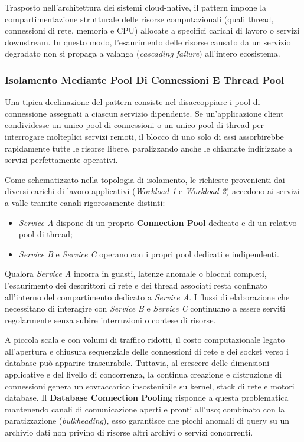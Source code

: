 \documentclass[11pt, a4paper]{article}
\begin{document}
Trasposto nell'architettura dei sistemi cloud-native, il pattern impone la compartimentazione strutturale delle risorse computazionali (quali thread, connessioni di rete, memoria e CPU) allocate a specifici carichi di lavoro o servizi downstream. In questo modo, l'esaurimento delle risorse causato da un servizio degradato non si propaga a valanga (\emph{cascading failure}) all'intero ecosistema.

\subsubsection{Isolamento Mediante Pool Di Connessioni E Thread Pool}

Una tipica declinazione del pattern consiste nel disaccoppiare i pool di connessione assegnati a ciascun servizio dipendente. Se un'applicazione client condividesse un unico pool di connessioni o un unico pool di thread per interrogare molteplici servizi remoti, il blocco di uno solo di essi assorbirebbe rapidamente tutte le risorse libere, paralizzando anche le chiamate indirizzate a servizi perfettamente operativi.


Come schematizzato nella topologia di isolamento, le richieste provenienti dai diversi carichi di lavoro applicativi (\emph{Workload 1} e \emph{Workload 2}) accedono ai servizi a valle tramite canali rigorosamente distinti:
\begin{itemize}[noitemsep]
    \item \emph{Service A} dispone di un proprio \textbf{Connection Pool} dedicato e di un relativo pool di thread;
    \item \emph{Service B} e \emph{Service C} operano con i propri pool dedicati e indipendenti.
\end{itemize}
Qualora \emph{Service A} incorra in guasti, latenze anomale o blocchi completi, l'esaurimento dei descrittori di rete e dei thread associati resta confinato all'interno del compartimento dedicato a \emph{Service A}. I flussi di elaborazione che necessitano di interagire con \emph{Service B} e \emph{Service C} continuano a essere serviti regolarmente senza subire interruzioni o contese di risorse.

A piccola scala e con volumi di traffico ridotti, il costo computazionale legato all'apertura e chiusura sequenziale delle connessioni di rete e dei socket verso i database può apparire trascurabile. Tuttavia, al crescere delle dimensioni applicative e del livello di concorrenza, la continua creazione e distruzione di connessioni genera un sovraccarico insostenibile su kernel, stack di rete e motori database. Il \textbf{Database Connection Pooling} risponde a questa problematica mantenendo canali di comunicazione aperti e pronti all'uso; combinato con la paratizzazione (\emph{bulkheading}), esso garantisce che picchi anomali di query su un archivio dati non privino di risorse altri archivi o servizi concorrenti.
\end{document}
